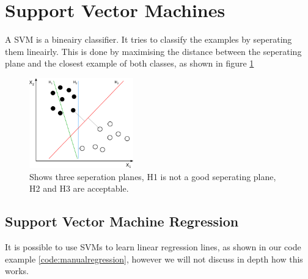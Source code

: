 \section{Support Vector Machines}
A SVM is a bineairy classifier. It tries to classify the examples by seperating them lineairly. This is done by maximising the distance between the seperating plane and the closest example of both classes, as shown in figure \ref{fig:svm}

\begin{figure}
\centering
\includegraphics[width=0.4\textwidth]{images/svm.png}
\caption{\label{fig:svm} Shows three seperation planes, H1 is not a good seperating plane, H2 and H3 are acceptable.}
\end{figure}

\subsection{Support Vector Machine Regression}
It is possible to use SVMs to learn linear regression lines, as shown in our code example \ref{code:manualregression}, however we will not discuss in depth how this works.